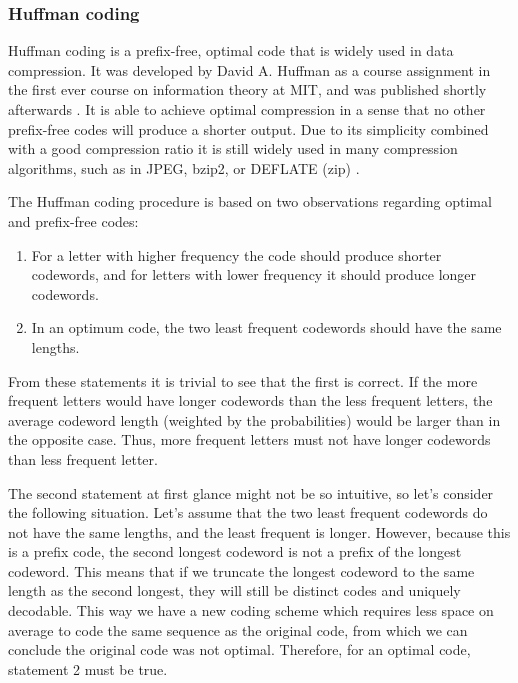   

      \subsubsection{Huffman coding}

      Huffman coding is a prefix-free, optimal code that is widely used in data compression. It was developed by David A. Huffman as a course assignment in the first ever course on information theory at MIT, and was published shortly afterwards \cite{huffman_method_1952}. It is able to achieve optimal compression in a sense that no other prefix-free codes will produce a shorter output. Due to its simplicity combined with a good compression ratio it is still widely used in many compression algorithms, such as in JPEG, bzip2, or DEFLATE (zip) \cite{salomon_handbook_2010}.
      
  
      The Huffman coding procedure is based on two observations regarding optimal and prefix-free codes:
      \begin{enumerate}
        \item For a letter with higher frequency the code should produce shorter codewords, and for letters with lower frequency it should produce longer codewords.
        \item In an optimum code, the two least frequent codewords should have the same lengths.
      \end{enumerate}
  
      From these statements it is trivial to see that the first is correct. If the more frequent letters would have longer codewords than the less frequent letters, the average codeword length (weighted by the probabilities) would be larger than in the opposite case. Thus, more frequent letters must not have longer codewords than less frequent letter.
  
      The second statement at first glance might not be so intuitive, so let's consider the following situation. Let's assume that the two least frequent codewords do not have the same lengths, and the least frequent is longer. However, because this is a prefix code, the second longest codeword is not a prefix of the longest codeword. This means that if we truncate the longest codeword to the same length as the second longest, they will still be distinct codes and uniquely decodable. This way we have a new coding scheme which requires less space on average to code the same sequence as the original code, from which we can conclude the original code was not optimal. Therefore, for an optimal code, statement 2 must be true.
  
